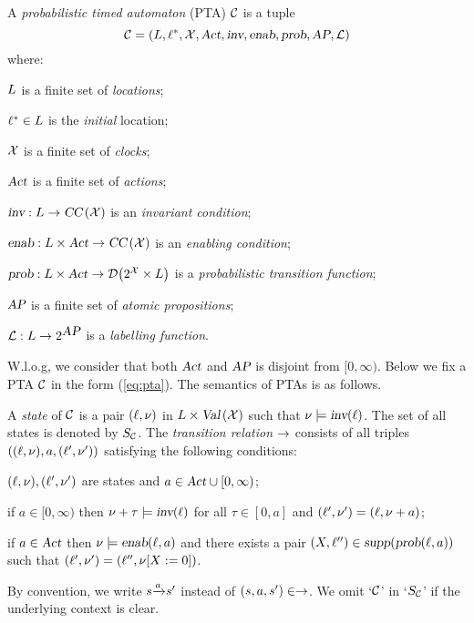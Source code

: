 \begin{definition}
A \emph{probabilistic timed automaton} (PTA) $\mathcal{C}$ is a tuple
\begin{equation}\label{eq:pta}
\mathcal{C}=\left(L, \ell^*, \mathcal{X}, \mbox{\sl Act}, \mbox{\sl inv}, \mbox{\sl enab},  \mbox{\sl prob}, \mbox{\sl AP}, \mathcal{L}\right)
\end{equation}
where:
\begin{compactitem}
\item $L$ is a finite set of \emph{locations};
\item $\ell^*\in L$ is the \emph{initial} location;
\item $\mathcal{X}$ is a finite set of \emph{clocks};
\item $\mbox{\sl Act}$ is a finite set of \emph{actions};
\item $\mbox{\sl inv}:L\rightarrow\mbox{\sl CC}\left(\mathcal{X}\right)$ is
an \emph{invariant condition};
\item $\mbox{\sl enab}:L\times\mbox{\sl Act}\rightarrow\mbox{\sl CC}\left(\mathcal{X}\right)$ is an \emph{enabling condition};
\item $\mbox{\sl prob}:L\times\mbox{\sl Act}\rightarrow{\mathcal{D}}{\left(2^{\mathcal{X}}\times L\right)}$ is a \emph{probabilistic transition function};
\item $\mbox{\sl AP}$ is a finite set of \emph{atomic propositions};
\item $\mathcal{L}:L\rightarrow 2^{\mbox{\sl AP}}$ is a \emph{labelling function}.
\end{compactitem}
\end{definition}
%
W.l.o.g, we consider that both $\mbox{\sl Act}$ and $\mbox{\sl AP}$ is disjoint from $[0,\infty)$. Below we fix a PTA $\mathcal{C}$ in the form (\ref{eq:pta}). The semantics of PTAs is as follows.

\smallskip {}
A \emph{state} of $\mathcal{C}$ is a pair $(\ell, \nu)$ in $L\times\mbox{\sl Val}\left(\mathcal{X}\right)$ such that $\nu\models \mbox{\sl inv}(\ell)$.
The set of all states is denoted by $S_{\mathcal{C}}$.
The \emph{transition relation} $\rightarrow$ consists of all triples $((\ell,\nu),a,(\ell',\nu'))$ satisfying
the following conditions:
\begin{compactitem}
\item $(\ell,\nu), (\ell',\nu')$ are states and $a\in\mbox{\sl Act}\cup [0,\infty)$;
\item if $a\in [0,\infty)$ then $\nu+\tau\models \mbox{\sl inv}(\ell)$ for all $\tau\in [0, a]$ and $(\ell',\nu')=(\ell,\nu+a)$;
\item if $a\in\mbox{\sl Act}$ then $\nu\models\mbox{\sl enab}(\ell,a)$ and there exists a pair $(X, \ell'')\in{\mbox{\sl supp}}(\mbox{\sl prob}(\ell,a))$ such that $(\ell',\nu')=(\ell'',{\nu}{\left[X:=0\right]})$.
\end{compactitem}
By convention, we write ${s}{\xrightarrow{a}}{s'}$ instead of $(s,a,s')\in\rightarrow$.
We omit `$\mathcal{C}$' in `$S_{\mathcal{C}}$' if the underlying context is clear.


